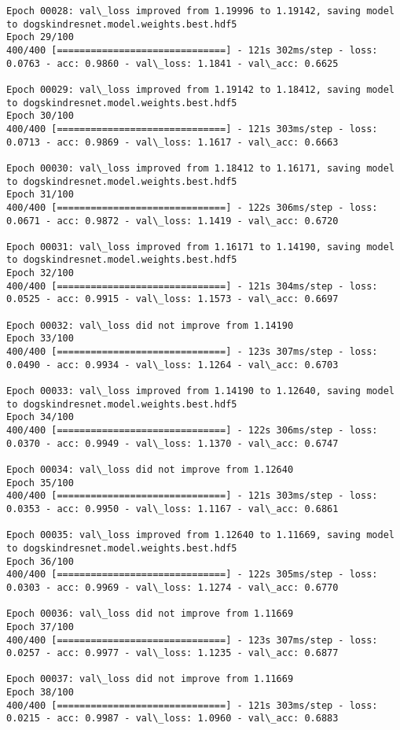 \documentclass[11pt]{article}
\begin{document}
\begin{Verbatim}[commandchars=\\\{\}]
Epoch 00028: val\_loss improved from 1.19996 to 1.19142, saving model to dogskindresnet.model.weights.best.hdf5
Epoch 29/100
400/400 [==============================] - 121s 302ms/step - loss: 0.0763 - acc: 0.9860 - val\_loss: 1.1841 - val\_acc: 0.6625

Epoch 00029: val\_loss improved from 1.19142 to 1.18412, saving model to dogskindresnet.model.weights.best.hdf5
Epoch 30/100
400/400 [==============================] - 121s 303ms/step - loss: 0.0713 - acc: 0.9869 - val\_loss: 1.1617 - val\_acc: 0.6663

Epoch 00030: val\_loss improved from 1.18412 to 1.16171, saving model to dogskindresnet.model.weights.best.hdf5
Epoch 31/100
400/400 [==============================] - 122s 306ms/step - loss: 0.0671 - acc: 0.9872 - val\_loss: 1.1419 - val\_acc: 0.6720

Epoch 00031: val\_loss improved from 1.16171 to 1.14190, saving model to dogskindresnet.model.weights.best.hdf5
Epoch 32/100
400/400 [==============================] - 121s 304ms/step - loss: 0.0525 - acc: 0.9915 - val\_loss: 1.1573 - val\_acc: 0.6697

Epoch 00032: val\_loss did not improve from 1.14190
Epoch 33/100
400/400 [==============================] - 123s 307ms/step - loss: 0.0490 - acc: 0.9934 - val\_loss: 1.1264 - val\_acc: 0.6703

Epoch 00033: val\_loss improved from 1.14190 to 1.12640, saving model to dogskindresnet.model.weights.best.hdf5
Epoch 34/100
400/400 [==============================] - 122s 306ms/step - loss: 0.0370 - acc: 0.9949 - val\_loss: 1.1370 - val\_acc: 0.6747

Epoch 00034: val\_loss did not improve from 1.12640
Epoch 35/100
400/400 [==============================] - 121s 303ms/step - loss: 0.0353 - acc: 0.9950 - val\_loss: 1.1167 - val\_acc: 0.6861

Epoch 00035: val\_loss improved from 1.12640 to 1.11669, saving model to dogskindresnet.model.weights.best.hdf5
Epoch 36/100
400/400 [==============================] - 122s 305ms/step - loss: 0.0303 - acc: 0.9969 - val\_loss: 1.1274 - val\_acc: 0.6770

Epoch 00036: val\_loss did not improve from 1.11669
Epoch 37/100
400/400 [==============================] - 123s 307ms/step - loss: 0.0257 - acc: 0.9977 - val\_loss: 1.1235 - val\_acc: 0.6877

Epoch 00037: val\_loss did not improve from 1.11669
Epoch 38/100
400/400 [==============================] - 121s 303ms/step - loss: 0.0215 - acc: 0.9987 - val\_loss: 1.0960 - val\_acc: 0.6883


\end{Verbatim}
\end{document}
